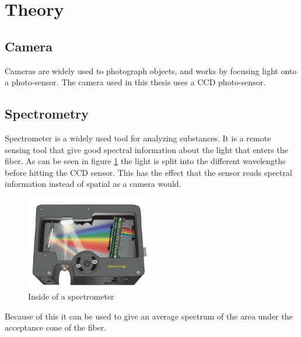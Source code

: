 \section{Theory}

\subsection{Camera}
Cameras are widely used to photograph objects, and works by focusing light onto a photo-sensor. The camera used in this thesis uses a CCD photo-sensor.

\subsection{Spectrometry}
Spectrometer is a widely used tool for analyzing substances. It is a remote sensing tool that give good spectral information about the light that enters the fiber. As can be seen in figure \ref{fig:spectrometer_inside} the light is split into the different wavelengths before hitting the CCD sensor. This has the effect that the sensor reads spectral information instead of spatial as a camera would. 

\begin{figure}[h]
    \centering
    \includegraphics[width=0.5\textwidth]{figures/Mini-spectrometer-open-bench.png}
    \caption{Inside of a spectrometer \cite{KAI0340640480}}
    \label{fig:spectrometer_inside}
\end{figure}

Because of this it can be used to give an average spectrum of the area under the acceptance cone of the fiber. 

